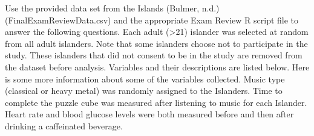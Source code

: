 \documentclass[
]{report}
\begin{document}

Use the provided data set from the Islands (Bulmer, n.d.) (FinalExamReviewData.csv) and the appropriate Exam Review R script file to answer the following questions. Each adult (\textgreater21) islander was selected at random from all adult islanders. Note that some islanders choose not to participate in the study. These islanders that did not consent to be in the study are removed from the dataset before analysis. Variables and their descriptions are listed below. Here is some more information about some of the variables collected. Music type (classical or heavy metal) was randomly assigned to the Islanders. Time to complete the puzzle cube was measured after listening to music for each Islander. Heart rate and blood glucose levels were both measured before and then after drinking a caffeinated beverage.
\end{document}
